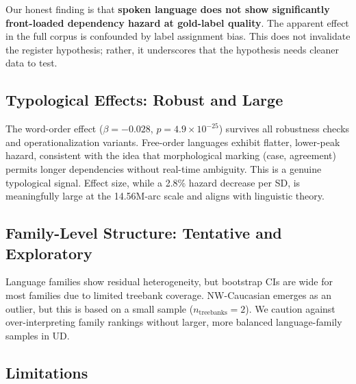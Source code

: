 \documentclass[11pt,letterpaper]{article}
\begin{document}
Our honest finding is that \textbf{spoken language does not show significantly front-loaded dependency hazard at gold-label quality}. The apparent effect in the full corpus is confounded by label assignment bias. This does not invalidate the register hypothesis; rather, it underscores that the hypothesis needs cleaner data to test.

\subsection{Typological Effects: Robust and Large}

The word-order effect ($\beta=-0.028$, $p=4.9\times10^{-25}$) survives all robustness checks and operationalization variants. Free-order languages exhibit flatter, lower-peak hazard, consistent with the idea that morphological marking (case, agreement) permits longer dependencies without real-time ambiguity. This is a genuine typological signal. Effect size, while a 2.8\% hazard decrease per SD, is meaningfully large at the 14.56M-arc scale and aligns with linguistic theory.

\subsection{Family-Level Structure: Tentative and Exploratory}

Language families show residual heterogeneity, but bootstrap CIs are wide for most families due to limited treebank coverage. NW-Caucasian emerges as an outlier, but this is based on a small sample ($n_{\text{treebanks}}=2$). We caution against over-interpreting family rankings without larger, more balanced language-family samples in UD.

\subsection{Limitations}
\end{document}
